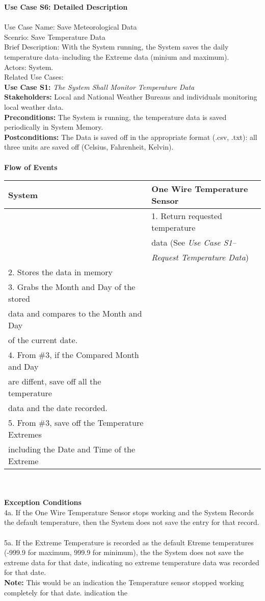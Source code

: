 \documentclass[letterpaper]{article}
\begin{document}
\noindent
\textbf{Use Case S6:  Detailed Description}\\\\
Use Case Name:  Save Meteorological Data\\
Scenrio:  Save Temperature Data\\
Brief Description:  With the System running, the System saves the
daily temperature data--including the Extreme data (minium and
maximum).\\
Actors:  System.\\
Related Use Cases:\\
\textbf{Use Case S1:  }\emph{The System Shall Monitor Temperature
Data}\\
\textbf{Stakeholders:  }Local and National Weather Bureaus and
individuals monitoring local weather data.\\
\textbf{Preconditions:  }The System is running, the temperature data
is saved periodically in System Memory.\\
\textbf{Postconditions:  }The Data is saved off in the appropriate
format (.csv, .txt):  all three units are saved off (Celsius,
Fahrenheit, Kelvin).\\\\
\textbf{Flow of Events}\\
\begin{tabular}{|l|l|}\hline
\textbf{System} & \textbf{One Wire Temperature Sensor}\\\hline
&1.  Return requested temperature\\
&    data (See \emph{Use Case S1--}\\
&    \emph{Request Temperature Data})\\\hline
2.  Stores the data in memory & \\\hline
3.  Grabs the Month and Day  of the stored &\\
    data and compares to the Month and Day &\\
    of the current date. &\\\hline
4.  From \#3, if the Compared Month and Day &\\
    are diffent, save off all the temperature &\\
    data and the date recorded. & \\\hline
5.  From \#3, save off the Temperature Extremes &\\
    including the Date and Time of the Extreme &\\\hline
\end{tabular}\\\\
\textbf{Exception Conditions}\\
4a.  If the One Wire Temperature Sensor stops working and
the System Records the default temperature, then the System does not
save the entry for that record.\\\\
5a.  If the Extreme Temperature is recorded as the default Etreme
temperatures (-999.9 for maximum, 999.9 for minimum), the the System
does not save the extreme data for that date, indicating no extreme
temperature data was recorded for that date.\\
\textbf{Note:  }This would be an indication the Temperature sensor
stopped working completely for that date.
indication the 
\end{document}
